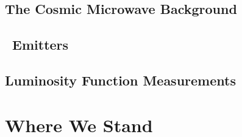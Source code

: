 \subsection{The Cosmic Microwave Background}\label{sec:CMB}
\subsection{\lya\ Emitters}
\subsection{Luminosity Function Measurements}

\section{Where We Stand}




